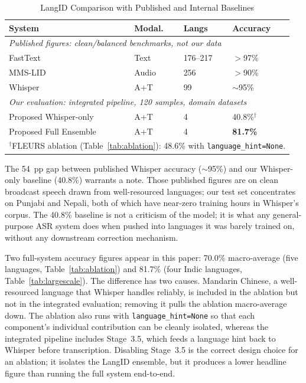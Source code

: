 \documentclass[conference]{IEEEtran}
\begin{document}
\begin{table}[htbp]
\caption{LangID Comparison with Published and Internal Baselines}
\label{tab:baselines}
\begin{center}
\begin{tabular}{llll}
\toprule
\textbf{System} & \textbf{Modal.} & \textbf{Langs} & \textbf{Accuracy} \\
\midrule
\multicolumn{4}{p{8cm}}{\footnotesize\textit{Published figures: clean/balanced benchmarks, not our data}} \\
FastText~\cite{joulin2017bag,costajussa2024nllb} & Text & 176--217 & $>$97\% \\
MMS-LID~\cite{pratap2023scaling} & Audio & 256 & $>$90\% \\
Whisper~\cite{radford2022whisper} & A+T & 99 & $\sim$95\% \\
\midrule
\multicolumn{4}{p{8cm}}{\footnotesize\textit{Our evaluation: integrated pipeline, 120 samples, domain datasets}} \\
Proposed Whisper-only & A+T & 4 & 40.8\%$^\dagger$ \\
Proposed Full Ensemble & A+T & 4 & \textbf{81.7\%} \\
\multicolumn{4}{p{7.5cm}}{\footnotesize $^\dagger$FLEURS ablation (Table~\ref{tab:ablation}): 48.6\% with \texttt{language\_hint=None}.} \\
\bottomrule
\end{tabular}
\end{center}
\end{table}

The 54~pp gap between published Whisper accuracy ($\sim$95\%) and our Whisper-only baseline (40.8\%) warrants a note. Those published figures are on clean broadcast speech drawn from well-resourced languages; our test set concentrates on Punjabi and Nepali, both of which have near-zero training hours in Whisper's corpus. The 40.8\% baseline is not a criticism of the model; it is what any general-purpose ASR system does when pushed into languages it was barely trained on, without any downstream correction mechanism.

Two full-system accuracy figures appear in this paper: 70.0\% macro-average (five languages, Table~\ref{tab:ablation}) and 81.7\% (four Indic languages, Table~\ref{tab:largescale}). The difference has two causes. Mandarin Chinese, a well-resourced language that Whisper handles reliably, is included in the ablation but not in the integrated evaluation; removing it pulls the ablation macro-average down. The ablation also runs with \texttt{language\_hint=None} so that each component's individual contribution can be cleanly isolated, whereas the integrated pipeline includes Stage~3.5, which feeds a language hint back to Whisper before transcription. Disabling Stage~3.5 is the correct design choice for an ablation; it isolates the LangID ensemble, but it produces a lower headline figure than running the full system end-to-end.
\end{document}
